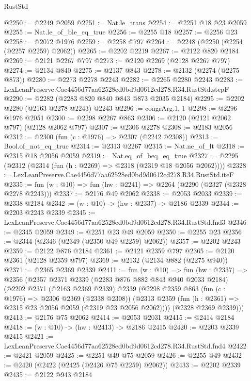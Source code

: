 \begin{lexlean}{RustStd}
\begin{coremodule}
@2250 := @2249 @2059
@2251 := Nat.le_trans
@2254 := @2251 @18 @23 @2059
@2255 := Nat.le_of_ble_eq_true
@2256 := @2255 @18
@2257 := @2256 @23
@2258 := @2072 @1976
@2259 := @2258 @797
@2264 := @2248 (@2250 (@2254 (@2257 @2259) @2062))
@2265 := @2202 @2219
@2267 := @2122 @820 @2184
@2269 := @2121 @2267 @797
@2273 := @2120 @2269 (@2128 @2267 @797)
@2274 := @2134 @840
@2275 := @2137 @843
@2278 := @2132 (@2274 (@2275 @873))
@2280 := @2273 @2278 @2243
@2282 := @2265 @2280 @2243
@2283 := LexLeanPreserve.Cae4456d77aa62528ed0bd9d0612cd278.R34.RustStd.stepF
@2290 := @2282 (@2283 @820 @840 @843 @873 @2035 @2184)
@2295 := @2202 @2280 (@2163 @2278 @2243) @2243
@2296 := congrArg.{1, 1}
@2298 := @2296 @1976 @2051
@2300 := @2298 @2267 @863
@2306 := @2120 (@2121 @2062 @797) (@2128 @2062 @797)
@2307 := @2306 @2278
@2308 := @2183 @2056
@2312 := @2300 (fun (c : @1976) => @2307 (@2242 @2308))
@2313 := Bool.of_not_eq_true
@2314 := @2313 @2267
@2315 := Nat.ne_of_lt
@2318 := @2315 @18 @2056 @2059
@2319 := Nat.eq_of_beq_eq_true
@2327 := @2295 (@2312 (@2314 (fun (h : @2269) => @2318 (@2319 @18 @2056 @2062))))
@2328 := LexLeanPreserve.Cae4456d77aa62528ed0bd9d0612cd278.R34.RustStd.iteF
@2335 := fun (w : @10) => fun (hw : @2241) => @2264 (@2290 (@2327 (@2328 @2278 @2243)))
@2337 := @2176 @49 @2062
@2338 := @2053 @2033
@2339 := @2338 @2184
@2342 := (w : @10) -> (hw : @2337) -> @2186 @2339
@2344 := @2203 @2243 @2339
@2345 := LexLeanPreserve.Cae4456d77aa62528ed0bd9d0612cd278.R34.RustStd.fnd3
@2346 := @2345 @2059
@2349 := @2251 @23 @49 @2059
@2350 := @2255 @23
@2356 := @2344 (@2346 (@2349 (@2350 @49 @2259) @2062))
@2357 := @2202 @2243
@2359 := @2122 @876 @2184
@2361 := @2121 @2359 @797
@2365 := @2120 @2361 (@2128 @2359 @797)
@2369 := @2132 (@2134 @882 (@2275 @940))
@2371 := @2365 @2369 @2339
@2411 := fun (w : @10) =>
  fun (hw : @2337) =>
  @2356
    (@2357
      @2371
      @2339
      (@2283 @876 @882 @843 @940 @2033 @2184)
      (@2202
        @2371
        (@2163 @2369 @2339)
        @2339
        (@2298
          @2359
          @863
          (fun (c : @1976) => @2306 @2369 (@2338 @2308))
          (@2313 @2359 (fun (h : @2361) => @2315 @23 @2056 @2059 (@2319 @23 @2056 @2062))))
        (@2328 @2369 @2339)))
@2413 := @2176 @75 @2062
@2414 := @2053 @2031
@2415 := @2414 @2184
@2418 := (w : @10) -> (hw : @2413) -> @2186 @2415
@2420 := @2203 @2339 @2415
@2421 := LexLeanPreserve.Cae4456d77aa62528ed0bd9d0612cd278.R34.RustStd.fnd4
@2422 := @2421 @2059
@2425 := @2251 @49 @75 @2059
@2426 := @2255 @49
@2432 := @2420 (@2422 (@2425 (@2426 @75 @2259) @2062))
@2433 := @2202 @2339
@2435 := @2122 @943 @2184

\end{coremodule}
\end{lexlean}
